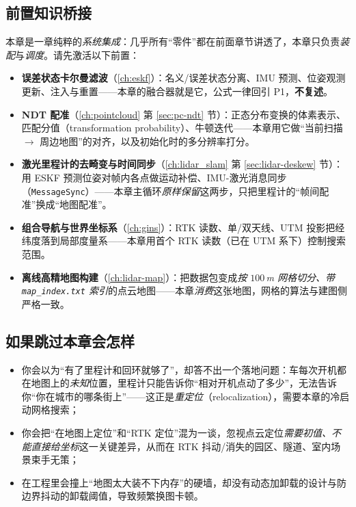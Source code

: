 \subsection*{前置知识桥接}
本章是一章纯粹的\emph{系统集成}：几乎所有“零件”都在前面章节讲透了，本章只负责\emph{装配}与\emph{调度}。请先激活以下前置：
\begin{itemize}
  \item \textbf{误差状态卡尔曼滤波}（\cref{ch:eskf}）：名义/误差状态分离、IMU 预测、位姿观测更新、注入与重置——本章的融合器就是它，公式一律回引 P1，\textbf{不复述}。
  \item \textbf{NDT 配准}（\cref{ch:pointcloud} 第 \ref{sec:pc-ndt} 节）：正态分布变换的体素表示、匹配分值（transformation probability）、牛顿迭代——本章用它做“当前扫描 $\to$ 周边地图”的对齐，以及初始化时的多分辨率打分。
  \item \textbf{激光里程计的去畸变与时间同步}（\cref{ch:lidar_slam} 第 \ref{sec:lidar-deskew} 节）：用 ESKF 预测位姿对帧内各点做运动补偿、IMU-激光消息同步（\texttt{MessageSync}）——本章主循环\emph{原样保留}这两步，只把里程计的“帧间配准”换成“地图配准”。
  \item \textbf{组合导航与世界坐标系}（\cref{ch:gins}）：RTK 读数、单/双天线、UTM 投影把经纬度落到局部度量系——本章用首个 RTK 读数（已在 UTM 系下）控制搜索范围。
  \item \textbf{离线高精地图构建}（\cref{ch:lidar-map}）：把数据包变成\emph{按 $100$\,m 网格切分、带 \texttt{map\_index.\allowbreak txt} 索引}的点云地图——本章\emph{消费}这张地图，网格的算法与建图侧严格一致。
\end{itemize}

\subsection*{如果跳过本章会怎样}
\begin{itemize}
  \item 你会以为“有了里程计和回环就够了”，却答不出一个落地问题：车每次开机都在地图上的\emph{未知}位置，里程计只能告诉你“相对开机点动了多少”，无法告诉你“你在城市的哪条街上”——这正是\emph{重定位}（relocalization），需要本章的冷启动网格搜索；
  \item 你会把“在地图上定位”和“RTK 定位”混为一谈，忽视点云定位\emph{需要初值、不能直接给坐标}这一关键差异，从而在 RTK 抖动/消失的园区、隧道、室内场景束手无策；
  \item 在工程里会撞上“地图太大装不下内存”的硬墙，却没有动态加卸载的设计与防边界抖动的卸载阈值，导致频繁换图卡顿。
\end{itemize}

